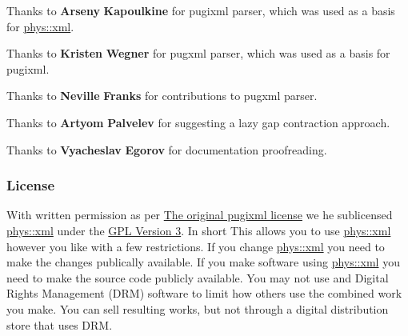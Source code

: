  \par
 Thanks to {\bfseries Arseny} {\bfseries Kapoulkine} for pugixml parser, which was used as a basis for \hyperlink{namespacephys_1_1xml}{phys::xml}. \par
 \par
 Thanks to {\bfseries Kristen} {\bfseries Wegner} for pugxml parser, which was used as a basis for pugixml. \par
 \par
 Thanks to {\bfseries Neville} {\bfseries Franks} for contributions to pugxml parser. \par
 \par
 Thanks to {\bfseries Artyom} {\bfseries Palvelev} for suggesting a lazy gap contraction approach. \par
 \par
 Thanks to {\bfseries Vyacheslav} {\bfseries Egorov} for documentation proofreading. \par
 \par
 \hypertarget{XMLManual_XMLLicense}{}\subsubsection{License}\label{XMLManual_XMLLicense}
With written permission as per \hyperlink{OriginalpugixmlLicense}{The original pugixml license} we he sublicensed \hyperlink{namespacephys_1_1xml}{phys::xml} under the \hyperlink{GPLLicense}{GPL Version 3}. In short This allows you to use \hyperlink{namespacephys_1_1xml}{phys::xml} however you like with a few restrictions. If you change \hyperlink{namespacephys_1_1xml}{phys::xml} you need to make the changes publically available. If you make software using \hyperlink{namespacephys_1_1xml}{phys::xml} you need to make the source code publicly available. You may not use and Digital Rights Management (DRM) software to limit how others use the combined work you make. You can sell resulting works, but not through a digital distribution store that uses DRM.

